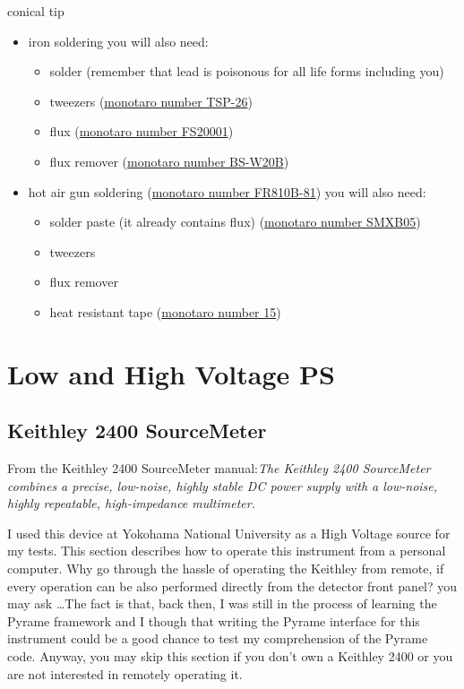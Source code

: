 conical tip
\begin{itemize}
\item iron soldering you will also need:
  \begin{itemize}
  \item solder (remember that lead is poisonous for all life forms including
    you)
  \item tweezers
    (\href{https://www.monotaro.com/p/0840/4873/?displayId=5}{monotaro number
      TSP-26})
  \item flux (\href{https://www.monotaro.com/p/3952/8833/?displayId=5}{monotaro
      number FS20001})
  \item flux remover
    (\href{https://www.monotaro.com/p/6215/1382/?displayId=5}{monotaro number
      BS-W20B})
  \end{itemize}
\item hot air gun soldering
  (\href{https://www.monotaro.com/p/4893/0954/?displayId=5}{monotaro number
    FR810B-81}) you will also need:
  \begin{itemize}
  \item solder paste (it already contains flux)
    (\href{https://www.monotaro.com/p/1001/3097/?displayId=5}{monotaro number
      SMXB05})
  \item tweezers
  \item flux remover
  \item heat resistant tape
    (\href{https://www.monotaro.com/p/5638/8526/?displayId=5}{monotaro number
      15})
  \end{itemize}
\end{itemize}

\section{Low and High Voltage PS}
\subsection{Keithley 2400 SourceMeter}
From the Keithley 2400 SourceMeter manual:\textit{The Keithley 2400 SourceMeter
  combines a precise, low-noise, highly stable DC power supply with a low-noise,
  highly repeatable, high-impedance multimeter.}

I used this device at Yokohama National University as a High Voltage source for
my tests. This section describes how to operate this instrument from a personal
computer. Why go through the hassle of operating the Keithley from remote, if
every operation can be also performed directly from the detector front panel?
you may ask \dots The fact is that, back then, I was still in the process of
learning the Pyrame framework and I though that writing the Pyrame interface for
this instrument could be a good chance to test my comprehension of the Pyrame
code. Anyway, you may skip this section if you don't own a Keithley 2400 or you
are not interested in remotely operating it.

